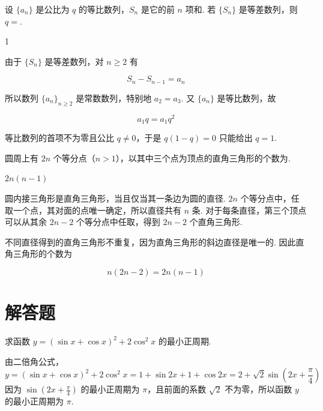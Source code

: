 \begin{problem}
设 \(\{a_{n}\}\) 是公比为 \(q\) 的等比数列，\(S_{n}\) 是它的前 \(n\) 项和. 若 \(\{S_{n}\}\) 是等差数列，则 \(q =\)\fillinblank{}.
\end{problem}

\begin{answer}
1
\end{answer}

\begin{solution}
由于 \(\{S_n\}\) 是等差数列，对 \(n\geqslant2\) 有

\[
S_n-S_{n-1}=a_n
\]

所以数列 \(\{a_n\}_{n\geqslant2}\) 是常数数列，特别地 \(a_2=a_3\). 又 \(\{a_n\}\) 是等比数列，故

\[
a_1q=a_1q^2
\]

等比数列的首项不为零且公比 \(q\ne0\)，于是 \(q(1-q)=0\) 只能给出 \(q=1\).
\end{solution}

\begin{problem}
圆周上有 \(2n\) 个等分点（\(n > 1\)），以其中三个点为顶点的直角三角形的个数为\fillinblank{}.
\end{problem}

\begin{answer}
\(2n(n-1)\)
\end{answer}

\begin{solution}
圆内接三角形是直角三角形，当且仅当其一条边为圆的直径. \(2n\) 个等分点中，任取一个点，其对面的点唯一确定，所以直径共有 \(n\) 条. 对于每条直径，第三个顶点可以从其余 \(2n-2\) 个等分点中任取，得到 \(2n-2\) 个直角三角形.

不同直径得到的直角三角形不重复，因为直角三角形的斜边直径是唯一的. 因此直角三角形的个数为

\[
n(2n-2)=2n(n-1)
\]
\end{solution}

\section{解答题}
\begin{problem}
求函数 \(y = (\sin x + \cos x)^2 + 2\cos^2 x\) 的最小正周期.
\end{problem}

\begin{solution}
由二倍角公式，
\[
y=(\sin x+\cos x)^2+2\cos^2x=1+\sin 2x+1+\cos 2x=2+\sqrt{2}\sin\left(2x+\frac{\pi}{4}\right)
\]
因为 \(\sin\left(2x+\frac{\pi}{4}\right)\) 的最小正周期为 \(\pi\)，且前面的系数 \(\sqrt{2}\) 不为零，所以函数 \(y\) 的最小正周期为 \(\pi\).
\end{solution}

